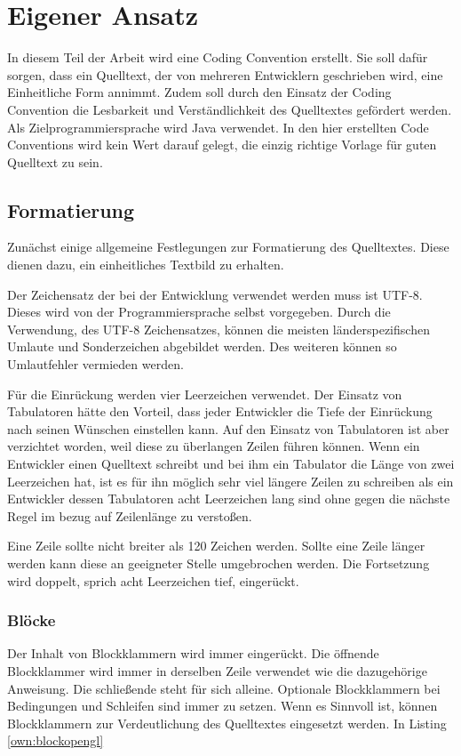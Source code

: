 \section{Eigener Ansatz}

In diesem Teil der Arbeit wird eine Coding Convention erstellt. Sie soll dafür sorgen, dass ein Quelltext, der von mehreren Entwicklern geschrieben wird, eine Einheitliche Form annimmt. Zudem soll durch den Einsatz der Coding Convention die Lesbarkeit und Verständlichkeit des Quelltextes gefördert werden. Als Zielprogrammiersprache wird Java verwendet. In den hier erstellten Code Conventions wird kein Wert darauf gelegt, die einzig richtige Vorlage für guten Quelltext zu sein. 


\subsection{Formatierung}
Zunächst einige allgemeine Festlegungen zur Formatierung des Quelltextes. Diese dienen dazu, ein einheitliches Textbild zu erhalten.

Der Zeichensatz der bei der Entwicklung verwendet werden muss ist UTF-8. Dieses wird von der Programmiersprache selbst vorgegeben. Durch die Verwendung, des UTF-8 Zeichensatzes, können die meisten länderspezifischen Umlaute und Sonderzeichen abgebildet werden. Des weiteren können so Umlautfehler vermieden werden.

Für die Einrückung werden vier Leerzeichen verwendet. Der Einsatz von Tabulatoren hätte den Vorteil, dass jeder Entwickler die Tiefe der Einrückung nach seinen Wünschen einstellen kann. Auf den Einsatz von Tabulatoren ist aber verzichtet worden, weil diese zu überlangen Zeilen führen können. Wenn ein Entwickler einen Quelltext schreibt und bei ihm ein Tabulator die Länge von zwei Leerzeichen hat, ist es für ihn möglich sehr viel längere Zeilen zu schreiben als ein Entwickler dessen Tabulatoren acht Leerzeichen lang sind ohne gegen die nächste Regel im bezug auf Zeilenlänge zu verstoßen.

Eine Zeile sollte nicht breiter als 120 Zeichen werden. Sollte eine Zeile länger werden kann diese an geeigneter Stelle umgebrochen werden. Die Fortsetzung wird doppelt, sprich acht Leerzeichen tief, eingerückt.

\subsubsection{Blöcke}
Der Inhalt von Blockklammern wird immer eingerückt. Die öffnende Blockklammer wird immer in derselben Zeile verwendet wie die dazugehörige Anweisung. Die schließende steht für sich alleine. Optionale Blockklammern bei Bedingungen und Schleifen sind immer zu setzen. Wenn es Sinnvoll ist, können Blockklammern zur Verdeutlichung des Quelltextes eingesetzt werden. In Listing \ref{own:blockopengl}

